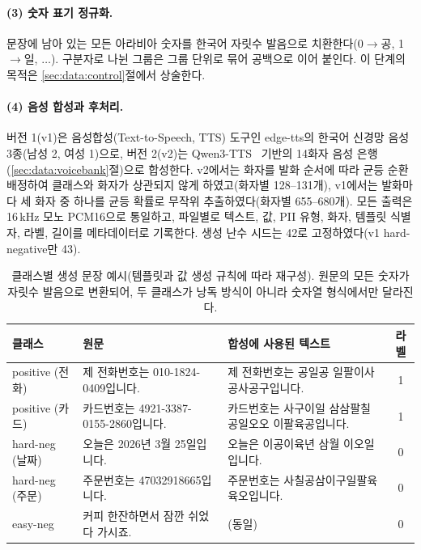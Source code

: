 \documentclass[11pt]{article}
\begin{document}
\paragraph{(3) 숫자 표기 정규화.}
문장에 남아 있는 모든 아라비아 숫자를 한국어 자릿수 발음으로 치환한다(0$\rightarrow$공,
1$\rightarrow$일, $\ldots$). 구분자로 나뉜 그룹은 그룹 단위로 묶어 공백으로 이어 붙인다.
이 단계의 목적은 \ref{sec:data:control}절에서 상술한다.

\paragraph{(4) 음성 합성과 후처리.}
버전 1(v1)은 음성합성(Text-to-Speech, TTS) 도구인 edge-tts의 한국어 신경망 음성
3종(남성 2, 여성 1)으로, 버전 2(v2)는
Qwen3-TTS~\cite{hu2026qwen3tts} 기반의 14화자 음성 은행(\ref{sec:data:voicebank}절)으로
합성한다. v2에서는 화자를 발화 순서에 따라 균등 순환 배정하여 클래스와 화자가 상관되지 않게
하였고(화자별 128--131개), v1에서는 발화마다 세 화자 중 하나를 균등 확률로 무작위
추출하였다(화자별 655--680개). 모든 출력은 16\,kHz 모노 PCM16으로 통일하고, 파일별로 텍스트,
값, PII 유형, 화자, 템플릿 식별자, 라벨, 길이를 메타데이터로 기록한다. 생성 난수 시드는
42로 고정하였다(v1 hard-negative만 43).

\begin{table}[!htbp]
\centering
\caption{클래스별 생성 문장 예시(템플릿과 값 생성 규칙에 따라 재구성). 원문의 모든 숫자가
자릿수 발음으로 변환되어, 두 클래스가 낭독 방식이 아니라 숫자열 형식에서만 달라진다.}
\label{tab:examples}
\small
\begin{tabular}{>{\raggedright\arraybackslash}p{18mm}p{52mm}p{55mm}c}
\toprule
클래스 & 원문 & 합성에 사용된 텍스트 & 라벨 \\
\midrule
positive (전화) & 제 전화번호는 010-1824-0409입니다. & 제 전화번호는 공일공 일팔이사 공사공구입니다. & 1 \\
positive (카드) & 카드번호는 4921-3387-0155-2860입니다. & 카드번호는 사구이일 삼삼팔칠 공일오오 이팔육공입니다. & 1 \\
hard-neg (날짜) & 오늘은 2026년 3월 25일입니다. & 오늘은 이공이육년 삼월 이오일입니다. & 0 \\
hard-neg (주문) & 주문번호는 47032918665입니다. & 주문번호는 사칠공삼이구일팔육육오입니다. & 0 \\
easy-neg & 커피 한잔하면서 잠깐 쉬었다 가시죠. & (동일) & 0 \\
\bottomrule
\end{tabular}
\end{table}
\end{document}
